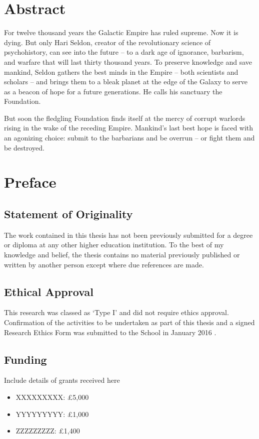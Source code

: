 
\tableofcontents

\chapter{Abstract}

For twelve thousand years the Galactic Empire has ruled supreme. Now it is dying. But only Hari Seldon, creator of the revolutionary science of psychohistory, can see into the future -- to a dark age of ignorance, barbarism, and warfare that will last thirty thousand years. To preserve knowledge and save mankind, Seldon gathers the best minds in the Empire -- both scientists and scholars -- and brings them to a bleak planet at the edge of the Galaxy to serve as a beacon of hope for a future generations. He calls his sanctuary the Foundation.

But soon the fledgling Foundation finds itself at the mercy of corrupt warlords rising in the wake of the receding Empire. Mankind's last best hope is faced with an agonizing choice: submit to the barbarians and be overrun -- or fight them and be destroyed.


\chapter{Preface}

\tocless\section{Statement of Originality}
The work contained in this thesis has not been previously submitted for a degree or diploma at any other higher education institution. %
To the best of my knowledge and belief, the thesis contains no material previously published or written by another person except where due references are made. %

\tocless\section{Ethical Approval}
This research was classed as `Type I' and did not require ethics approval. Confirmation of the activities to be undertaken as part of this thesis and a signed Research Ethics Form was submitted to the School in January 2016 . %

\tocless\section{Funding}
Include details of grants received here
\begin{itemize}
\item XXXXXXXXX: \pounds5,000
\item YYYYYYYYY: \pounds1,000
\item ZZZZZZZZZ: \pounds1,400
\end{itemize}

